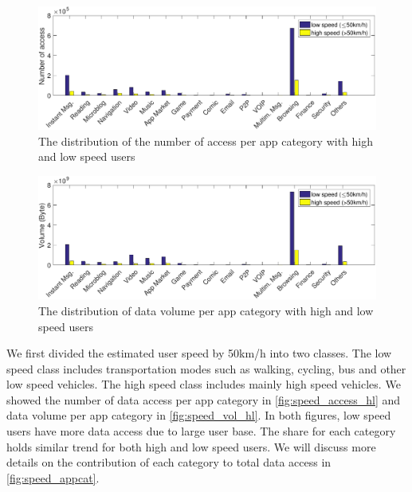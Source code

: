 \begin{figure}[h]
    \centering
    \includegraphics[width=\linewidth]{./figures/num_access_high_low_speed_8_6.pdf}
    \caption{The distribution of the number of access per app category with high and low speed users}
    \label{fig:speed_access_hl}
\end{figure}

\begin{figure}[h]
    \centering
    \includegraphics[width=\linewidth]{./figures/volume_high_low_speed_8_6.pdf}
    \caption{The distribution of data volume per app category with high and low speed users}
    \label{fig:speed_vol_hl}
\end{figure}

We first divided the estimated user speed by 50km/h into two classes. The low speed class includes transportation modes such as walking, cycling, bus and other low speed vehicles. The high speed class includes mainly high speed vehicles. We showed the number of data access per app category in \autoref{fig:speed_access_hl} and data volume per app category in \autoref{fig:speed_vol_hl}. In both figures, low speed users have more data access due to large user base. The share for each category holds similar trend for both high and low speed users. We will discuss more details on the contribution of each category to total data access in \autoref{fig:speed_appcat}.

